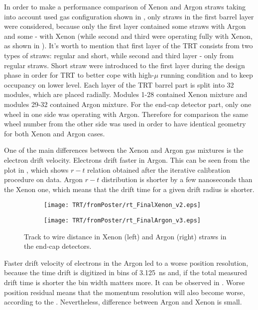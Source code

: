 In order to make a performance comparison of Xenon and Argon straws taking into account used gas configuration shown in ,
only straws in the first barrel layer were considered, because only the first layer contained some straws with Argon and some - with Xenon 
(while second and third were operating fully with Xenon, as shown in ).
It's worth to mention that first layer of the TRT consists from two types of straws: regular and short, while second and third layer - only from regular straws.
Short straw were introduced to the first layer during the design phase in order for TRT to
better cope with high-$\mu$ running condition and to keep occupancy on lower level.
Each layer of the TRT barrel part is split into 32 modules, which are placed radially. 
Modules 1-28 contained Xenon mixture and modules 29-32 contained Argon mixture.
For the end-cap detector part, only one wheel in one side was operating with Argon. Therefore for comparison the same wheel number from the other side was used in order
to have identical geometry for both Xenon and Argon cases.

One of the main differences between the Xenon and Argon gas mixtures is the electron drift velocity. Electrons drift faster in Argon. 
This can be seen from the plot in , 
which shows $r-t$ relation obtained after the iterative calibration procedure on data.
Argon $r-t$ distribution is shorter by a few nanoseconds than the Xenon one, which means that the drift time for a given drift radius is shorter.

\begin{figure}
\begin{subfigure}{.5\textwidth}
  \centering
  \texttt{[image: TRT/fromPoster/rt\_FinalXenon\_v2.eps]}
\end{subfigure}%
\begin{subfigure}{.5\textwidth}
  \centering
  \texttt{[image: TRT/fromPoster/rt\_FinalArgon\_v3.eps]}
\end{subfigure}

\caption{Track to wire distance in Xenon (left) and Argon (right) straws in the end-cap detectors.}
  \label{fig:RT_xenon_argon}
\end{figure}

Faster drift velocity of electrons in the Argon led to a worse position resolution,
because the time drift is digitized in bins of 3.125~ns and, if the total measured drift time is shorter the bin width matters more.
It can be observed in . Worse position residual means that the momentum resolution will also become worse, according to the
. Nevertheless, difference between Argon and Xenon is small.

